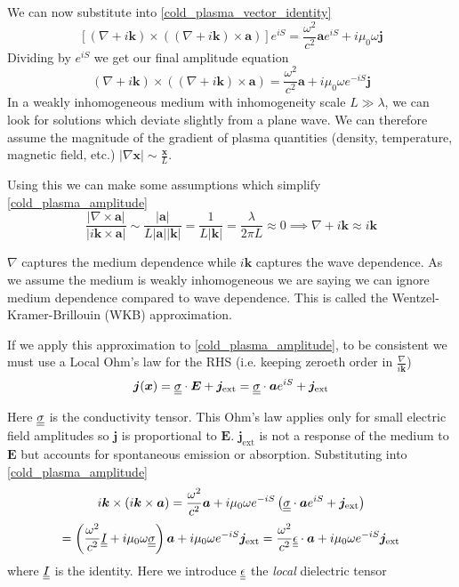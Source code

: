 We can now substitute into \eqref{cold_plasma_vector_identity}
\begin{equation}
	\left[ \left( \nabla + i \bm{k} \right) \times \left(\left( \nabla + i \bm{k} \right) \times \bm{a} \right)\right]e^{iS} = \frac{\omega^2}{c^2} \bm{a} e^{iS} + i \mu_0 \omega \bm{j}
\end{equation}
Dividing by $e^{iS}$ we get our final amplitude equation
\begin{equation}\label{cold_plasma_amplitude}
	\left( \nabla + i \bm{k} \right) \times \left( \left( \nabla + i \bm{k} \right) \times \bm{a} \right) = \frac{\omega^2}{c^2} \bm{a} + i \mu_0 \omega e^{-iS} \bm{j}
\end{equation}
In a weakly inhomogeneous medium with inhomogeneity scale $L \gg \lambda$, we can look for solutions which deviate slightly from a plane wave. We can therefore assume the magnitude of the gradient of plasma quantities (density, temperature, magnetic field, etc.) $|\nabla \bm{x}| \sim \frac{\bm{x}}{L}$.

Using this we can make some assumptions which simplify \eqref{cold_plasma_amplitude}
\begin{equation}
	\frac{|\nabla \times \bm{a}|}{|i \bm{k} \times \bm{a}|} \sim \frac{|\bm{a}|}{L |\bm{a}| |\bm{k}|} = \frac{1}{L |\bm{k}|} = \frac{\lambda}{2 \pi L} \approx 0 \implies \nabla + i \bm{k} \approx i \bm{k}
\end{equation}

$\nabla$ captures the medium dependence while $i \bm{k}$ captures the wave dependence. As we assume the medium is weakly inhomogeneous we are saying we can ignore medium dependence compared to wave dependence. This is called the Wentzel-Kramer-Brillouin (WKB) approximation.

If we apply this approximation to \eqref{cold_plasma_amplitude}, to be consistent we must use a Local Ohm's law for the RHS (i.e. keeping zeroeth order in $\frac{\nabla}{i \bm{k}}$)
\begin{equation}
	\bm{j}(\bm{x}) = \underline{\underline{\sigma}} \cdot \bm{E} + \bm{j}_{\text{ext}} = \underline{\underline{\sigma}} \cdot \bm{a} e^{iS} + \bm{j}_{\text{ext}}
\end{equation}

Here $\underline{\underline{\sigma}}$ is the conductivity tensor. This Ohm's law applies only for small electric field amplitudes so $\bm{j}$ is proportional to $\bm{E}$. $\bm{j}_{\text{ext}}$ is not a response of the medium to $\bm{E}$ but accounts for spontaneous emission or absorption. Substituting into \eqref{cold_plasma_amplitude}
\begin{equation*}
	i \bm{k} \times \left( i \bm{k} \times \bm{a} \right) = \frac{\omega^2}{c^2} \bm{a} + i \mu_0 \omega e^{-iS} \left( \underline{\underline{\sigma}} \cdot \bm{a} e^{iS} + \bm{j}_{\text{ext}} \right)
\end{equation*}
\begin{equation}
	= \left( \frac{\omega^2}{c^2} \underline{\underline{I}} + i \mu_0 \omega \underline{\underline{\sigma}} \right) \bm{a} + i \mu_0 \omega e^{-iS} \bm{j}_{\text{ext}} = \frac{\omega^2}{c^2} \underline{\underline{\epsilon}} \cdot \bm{a} + i \mu_0 \omega e^{-iS} \bm{j}_{\text{ext}}
\end{equation}
where $\underline{\underline{I}}$ is the identity. Here we introduce $\underline{\underline{\epsilon}}$ the \textit{local} dielectric tensor

